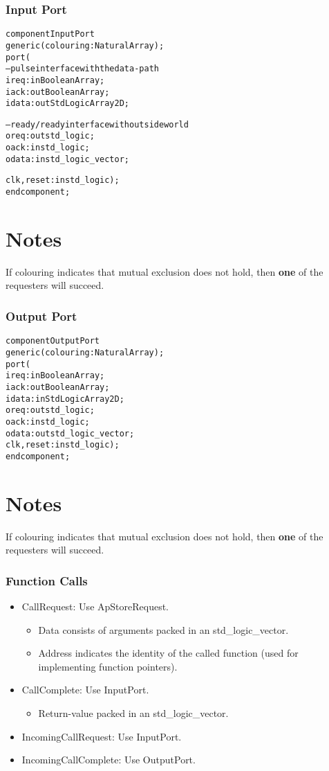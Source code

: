 \documentclass{beamer}
\begin{document}
\begin{frame}[fragile]
  \frametitle{Input Port}
\begin{alltt}
component InputPort
  generic (colouring: NaturalArray);
  port (
    -- pulse interface with the data-path
    ireq       : in  BooleanArray;
    iack       : out BooleanArray;
    idata      : out StdLogicArray2D;
    
    -- ready/ready interface with outside world
    oreq       : out std_logic;
    oack       : in  std_logic;
    odata      : in  std_logic_vector;
    
    clk, reset : in  std_logic);
end component;
\end{alltt}
\section{Notes}
If colouring indicates that mutual 
exclusion does not hold, then {\bf one} of the requesters
will succeed.
\end{frame}

\begin{frame}[fragile]
  \frametitle{Output Port}
\begin{alltt}
component OutputPort
  generic (colouring: NaturalArray);
  port (
    ireq       : in  BooleanArray;
    iack       : out BooleanArray;
    idata      : in  StdLogicArray2D;
    oreq       : out std_logic;
    oack       : in  std_logic;
    odata      : out std_logic_vector;
    clk, reset : in  std_logic);
end component;
\end{alltt}
\section{Notes}
If colouring indicates that mutual 
exclusion does not hold, then {\bf one} of the requesters
will succeed.
\end{frame}

\begin{frame}
  \frametitle{Function Calls}
  \begin{itemize}
  \item CallRequest: Use ApStoreRequest.
    \begin{itemize}
    \item Data consists of arguments packed in an std\_logic\_vector.
    \item Address indicates the identity of the called function (used
      for implementing function pointers).
    \end{itemize}
  \item CallComplete: Use InputPort.
    \begin{itemize}
    \item Return-value packed in an std\_logic\_vector.
    \end{itemize}
  \item IncomingCallRequest: Use InputPort.
  \item IncomingCallComplete: Use OutputPort.
  \end{itemize}
\end{frame}
\end{document}
